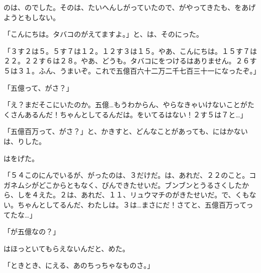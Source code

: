 のは、のでした。そのは、たいへんしがっていたので、がやってきたも、をあげようともしない。

「こんにちは。タバコのがえてますよ。」と、は、そのにった。

「３す２は５。５す７は１２。１２す３は１５。やあ、こんにちは。１５す７は２２。２２す６は２８。やあ、どうも。タバコにをつけるはありません。２６す５は３１。ふん、うまいぞ。これで五億百六十二万二千七百三十一になったぞ。」

「五億って、がさ？」

「え？まだそこにいたのか。五億…もうわからん、やらなきゃいけないことがたくさんあるんだ！ちゃんとしてるんだは。をいてるはない！２す５は７と…」

「五億百万って、がさ？」と、かきすと、どんなことがあっても、にはかないは、りした。

はをげた。

「５４このにんでいるが、がったのは、３だけだ。は、あれだ、２２のこと。コガネムシがどこからともなく、びんできたせいだ。ブンブンとうるさくしたから、しを４えた。２は、あれだ、１１、リュウマチのがきたせいだ。で、くもない。ちゃんとしてるんだ、わたしは。３は…まさにだ！さてと、五億百万ってってたな…」

「が五億なの？」

はほっといてもらえないんだと、めた。

「ときとき、にえる、あのちっちゃなものさ。」

